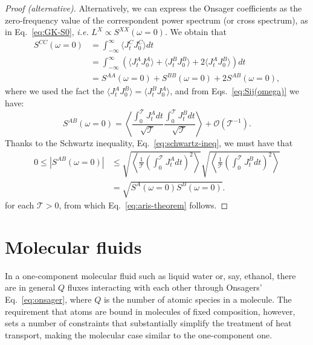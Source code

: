 \begin{LEtext}
\begin{proof}[Proof (alternative)]
Alternatively, we can express the Onsager coefficients as the zero-frequency value of the correspondent power spectrum (or cross spectrum), as in Eq.~\eqref{eq:GK-S0}, \emph{i.e.} $L^{X} \propto S^{XX}(\omega=0)$. We obtain that
\begin{align}
    S^{CC}(\omega=0) &= \int_{-\infty}^\infty \langle J^C_t J^C_0 \rangle dt \nonumber\\
        &=\int_{-\infty}^\infty \left(\langle J^A_t J^A_0 \rangle + \langle J^B_t J^B_0 \rangle + 2\langle J^A_t J^B_0 \rangle \right) dt  \nonumber\\
        &= S^{AA}(\omega=0) + S^{BB}(\omega=0) + 2 S^{AB}(\omega=0),
\end{align}
where we used the fact the $\langle J^A_t J^B_0 \rangle = \langle J^B_t J^A_0 \rangle$, and from Eqs.~\eqref{eq:Sij(omega)} we have:
\begin{equation}
    S^{AB}(\omega=0) = \left\langle \frac{\int_0^\mathcal{T} J^A_t dt}{\sqrt{\mathcal{T}}} \frac{\int_0^\mathcal{T} J^B_t dt}{\sqrt{\mathcal{T}}} \right\rangle + \mathcal{O}(\mathcal{T}^{-1}) .
\end{equation}
Thanks to the Schwartz inequality, Eq.~\eqref{eq:schwartz-ineq}, we must have that
\begin{equation}
\begin{aligned}
    0 \leq \left|S^{AB}(\omega=0)\right| &\leq \sqrt{\left\langle\frac{1}{\mathcal{T}}\left(\int_0^\mathcal{T} J^A_t dt\right)^2\right\rangle} \sqrt{\left\langle\frac{1}{\mathcal{T}}\left(\int_0^\mathcal{T} J^B_t dt\right)^2\right\rangle} \\
    &= \sqrt{S^{A}(\omega=0) S^{B}(\omega=0)} .
\end{aligned}
\end{equation}
for each $\mathcal{T}>0$, from which Eq.~\eqref{eq:aris-theorem} follows.
\end{proof}
\end{LEtext}


\section{Molecular fluids}  \label{sec:MolecularFluids}
In a one-component molecular fluid such as liquid water or, say, ethanol, there are in general $Q$ fluxes interacting with each other through Onsagers' Eq.~\eqref{eq:onsager}, where $Q$ is the number of atomic species in a molecule. The requirement that atoms are bound in molecules of fixed composition, however, sets a number of constraints that substantially simplify the treatment of heat transport, making the molecular case similar to the one-component one.

